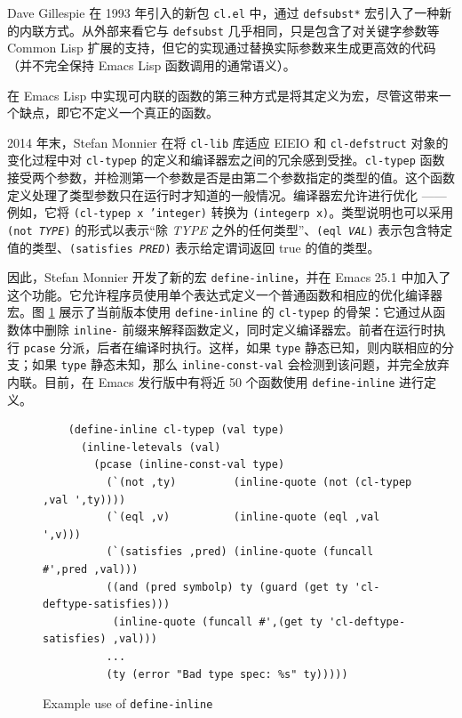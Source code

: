 \documentclass[format=acmsmall,screen]{acmart}
\newcommand \id[1] {\textrm{\textsl{#1}}}
\begin{document}
Dave Gillespie 在 1993 年引入的新包 \texttt{cl.el} 中，通过 \texttt{defsubst*} 宏引入了一种新的内联方式。从外部来看它与 \texttt{defsubst} 几乎相同，只是包含了对关键字参数等 Common Lisp 扩展的支持，但它的实现通过替换实际参数来生成更高效的代码（并不完全保持 Emacs Lisp 函数调用的通常语义）。

在 Emacs Lisp 中实现可内联的函数的第三种方式是将其定义为宏，尽管这带来一个缺点，即它不定义一个真正的函数。

2014 年末，Stefan Monnier 在将 \texttt{cl-lib} 库适应 EIEIO 和 \texttt{cl-defstruct} 对象的变化过程中对 \texttt{cl-typep} 的定义和编译器宏之间的冗余感到受挫。\texttt{cl-typep} 函数接受两个参数，并检测第一个参数是否是由第二个参数指定的类型的值。这个函数定义处理了类型参数只在运行时才知道的一般情况。编译器宏允许进行优化 —— 例如，它将 \texttt{(cl-typep x 'integer)} 转换为 \texttt{(integerp x)}。类型说明也可以采用 \texttt{(not \id{TYPE})} 的形式以表示“除 \id{TYPE} 之外的任何类型”、\texttt{(eql \id{VAL})} 表示包含特定值的类型、\texttt{(satisfies \id{PRED})} 表示给定谓词返回 true 的值的类型。

因此，Stefan Monnier 开发了新的宏 \texttt{define-inline}，并在 Emacs 25.1 中加入了这个功能。它允许程序员使用单个表达式定义一个普通函数和相应的优化编译器宏。图 \ref{fig:define-inline} 展示了当前版本使用 \texttt{define-inline} 的 \texttt{cl-typep} 的骨架：它通过从函数体中删除 \texttt{inline-} 前缀来解释函数定义，同时定义编译器宏。前者在运行时执行 \texttt{pcase} 分派，后者在编译时执行。这样，如果 \texttt{type} 静态已知，则内联相应的分支；如果 \texttt{type} 静态未知，那么 \texttt{inline-const-val} 会检测到该问题，并完全放弃内联。目前，在 Emacs 发行版中有将近 50 个函数使用 \texttt{define-inline} 进行定义。

\begin{figure}
\begin{verbatim}
    (define-inline cl-typep (val type)
      (inline-letevals (val)
        (pcase (inline-const-val type)
          (`(not ,ty)         (inline-quote (not (cl-typep ,val ',ty))))
          (`(eql ,v)          (inline-quote (eql ,val ',v)))
          (`(satisfies ,pred) (inline-quote (funcall #',pred ,val)))
          ((and (pred symbolp) ty (guard (get ty 'cl-deftype-satisfies)))
           (inline-quote (funcall #',(get ty 'cl-deftype-satisfies) ,val)))
          ...
          (ty (error "Bad type spec: %s" ty)))))
\end{verbatim}
  \caption{Example use of \texttt{define-inline}}
  \label{fig:define-inline}
\end{figure}
\end{document}
